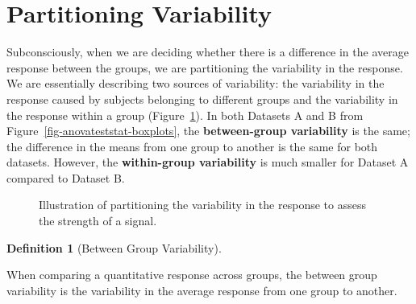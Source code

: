 \documentclass[
  letterpaper,
  DIV=11,
  numbers=noendperiod]{scrreprt}
\theoremstyle{definition}
\newtheorem{definition}{Definition}[chapter]
\theoremstyle{definition}
\theoremstyle{plain}
\theoremstyle{remark}
\begin{document}
\section{Partitioning Variability}\label{partitioning-variability-1}

Subconsciously, when we are deciding whether there is a difference in
the average response between the groups, we are partitioning the
variability in the response. We are essentially describing two sources
of variability: the variability in the response caused by subjects
belonging to different groups and the variability in the response within
a group (Figure~\ref{fig-anovateststat-partition-variability}). In both
Datasets A and B from Figure~\ref{fig-anovateststat-boxplots}, the
\textbf{between-group variability} is the same; the difference in the
means from one group to another is the same for both datasets. However,
the \textbf{within-group variability} is much smaller for Dataset A
compared to Dataset B.

\begin{figure}


\caption{\label{fig-anovateststat-partition-variability}Illustration of
partitioning the variability in the response to assess the strength of a
signal.}

\end{figure}%

\begin{definition}[Between Group
Variability]\protect\hypertarget{def-between-group-variability}{}\label{def-between-group-variability}

When comparing a quantitative response across groups, the between group
variability is the variability in the average response from one group to
another.

\end{definition}
\end{document}
